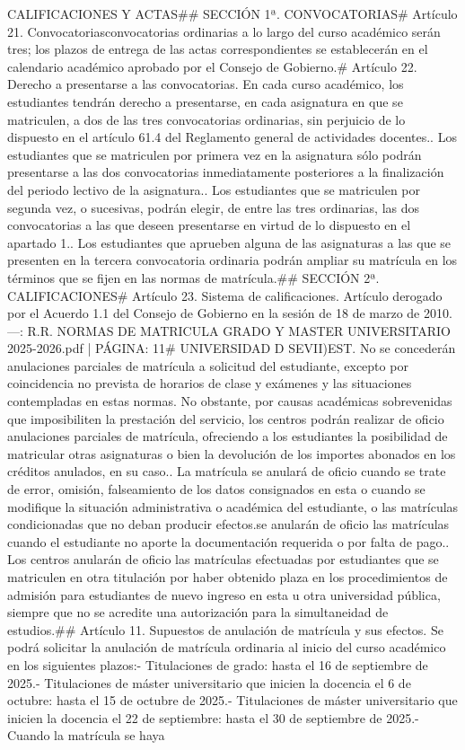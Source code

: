 \documentclass{article}
\begin{document}
\begin{itemize}
{{{{{CALIFICACIONES Y ACTAS\n\n## SECCIÓN 1ª. CONVOCATORIAS\n\n# Artículo 21. Convocatorias\n\nLas convocatorias ordinarias a lo largo del curso académico serán tres; los plazos de entrega de las actas correspondientes se establecerán en el calendario académico aprobado por el Consejo de Gobierno.\n\n# Artículo 22. Derecho a presentarse a las convocatorias\n{}. En cada curso académico, los estudiantes tendrán derecho a presentarse, en cada asignatura en que se matriculen, a dos de las tres convocatorias ordinarias, sin perjuicio de lo dispuesto en el artículo 61.4 del Reglamento general de actividades docentes.\n{}. Los estudiantes que se matriculen por primera vez en la asignatura sólo podrán presentarse a las dos convocatorias inmediatamente posteriores a la finalización del periodo lectivo de la asignatura.\n{}. Los estudiantes que se matriculen por segunda vez, o sucesivas, podrán elegir, de entre las tres ordinarias, las dos convocatorias a las que deseen presentarse en virtud de lo dispuesto en el apartado 1.\n{}. Los estudiantes que aprueben alguna de las asignaturas a las que se presenten en la tercera convocatoria ordinaria podrán ampliar su matrícula en los términos que se fijen en las normas de matrícula.\n\n## SECCIÓN 2ª. CALIFICACIONES\n\n# Artículo 23. Sistema de calificaciones\n{}. Artículo derogado por el Acuerdo 1.1 del Consejo de Gobierno en la sesión de 18 de marzo de 2010.\n\n---\n\nFUENTE: R.R. NORMAS DE MATRICULA GRADO Y MASTER UNIVERSITARIO 2025-2026.pdf | PÁGINA: 11\n# UNIVERSIDAD D SEVII\n\nC)EST\n{}. No se concederán anulaciones parciales de matrícula a solicitud del estudiante, excepto por coincidencia no prevista de horarios de clase y exámenes y las situaciones contempladas en estas normas. No obstante, por causas académicas sobrevenidas que imposibiliten la prestación del servicio, los centros podrán realizar de oficio anulaciones parciales de matrícula, ofreciendo a los estudiantes la posibilidad de matricular otras asignaturas o bien la devolución de los importes abonados en los créditos anulados, en su caso.\n{}. La matrícula se anulará de oficio cuando se trate de error, omisión, falseamiento de los datos consignados en esta o cuando se modifique la situación administrativa o académica del estudiante, o las matrículas condicionadas que no deban producir efectos.\n\nAsimismo se anularán de oficio las matrículas cuando el estudiante no aporte la documentación requerida o por falta de pago.\n{}. Los centros anularán de oficio las matrículas efectuadas por estudiantes que se matriculen en otra titulación por haber obtenido plaza en los procedimientos de admisión para estudiantes de nuevo ingreso en esta u otra universidad pública, siempre que no se acredite una autorización para la simultaneidad de estudios.\n\n## Artículo 11. Supuestos de anulación de matrícula y sus efectos\n{}. Se podrá solicitar la anulación de matrícula ordinaria al inicio del curso académico en los siguientes plazos:\n\n- Titulaciones de grado: hasta el 16 de septiembre de 2025.\n- Titulaciones de máster universitario que inicien la docencia el 6 de octubre: hasta el 15 de octubre de 2025.\n- Titulaciones de máster universitario que inicien la docencia el 22 de septiembre: hasta el 30 de septiembre de 2025.\n- Cuando la matrícula se haya }}}}}
\end{itemize}
\end{document}
